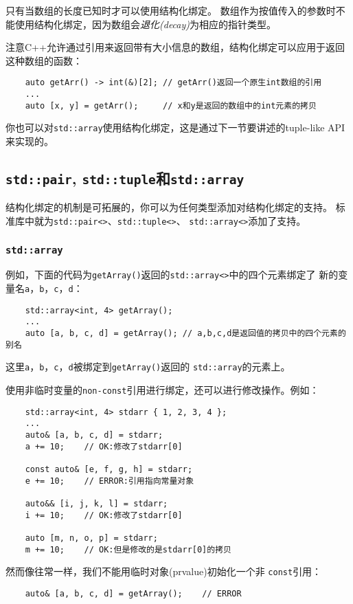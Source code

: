 只有当数组的长度已知时才可以使用结构化绑定。
数组作为按值传入的参数时不能使用结构化绑定，因为数组会\emph{退化(decay)}为相应的指针类型。

注意C++允许通过引用来返回带有大小信息的数组，结构化绑定可以应用于返回这种数组的函数：
\begin{lstlisting}
    auto getArr() -> int(&)[2]; // getArr()返回一个原生int数组的引用
    ...
    auto [x, y] = getArr();     // x和y是返回的数组中的int元素的拷贝
\end{lstlisting}
你也可以对\texttt{std::array}使用结构化绑定，这是通过下一节要讲述的tuple-like API来实现的。

\subsection{\texttt{std::pair}, \texttt{std::tuple}和\texttt{std::array}}
结构化绑定的机制是可拓展的，你可以为任何类型添加对结构化绑定的支持。
标准库中就为\texttt{std::pair<>}、\texttt{std::tuple<>}、
\texttt{std::array<>}添加了支持。

\subsubsection{\texttt{std::array}}
例如，下面的代码为\texttt{getArray()}返回的\texttt{std::array<>}中的四个元素绑定了
新的变量名\texttt{a}，\texttt{b}，\texttt{c}，\texttt{d}：
\begin{lstlisting}
    std::array<int, 4> getArray();
    ...
    auto [a, b, c, d] = getArray(); // a,b,c,d是返回值的拷贝中的四个元素的别名
\end{lstlisting}
这里\texttt{a}，\texttt{b}，\texttt{c}，\texttt{d}被绑定到\texttt{getArray()}返回的
\texttt{std::array}的元素上。

使用非临时变量的\texttt{non-const}引用进行绑定，还可以进行修改操作。例如：
\begin{lstlisting}
    std::array<int, 4> stdarr { 1, 2, 3, 4 };
    ...
    auto& [a, b, c, d] = stdarr;
    a += 10;    // OK:修改了stdarr[0]

    const auto& [e, f, g, h] = stdarr;
    e += 10;    // ERROR:引用指向常量对象

    auto&& [i, j, k, l] = stdarr;
    i += 10;    // OK:修改了stdarr[0]

    auto [m, n, o, p] = stdarr;
    m += 10;    // OK:但是修改的是stdarr[0]的拷贝
\end{lstlisting}
然而像往常一样，我们不能用临时对象(prvalue)初始化一个非 \texttt{const}引用：
\begin{lstlisting}
    auto& [a, b, c, d] = getArray();    // ERROR
\end{lstlisting}


